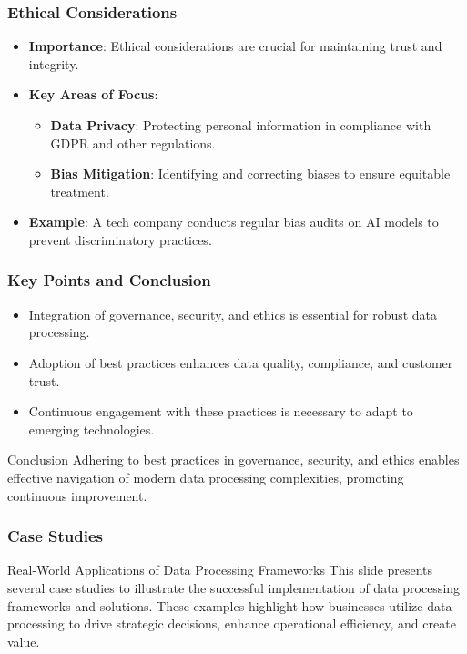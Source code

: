 \documentclass{beamer}
\begin{document}
\begin{frame}[fragile]
    \frametitle{Ethical Considerations}
    \begin{itemize}
        \item \textbf{Importance}: Ethical considerations are crucial for maintaining trust and integrity.
        \item \textbf{Key Areas of Focus}:
        \begin{itemize}
            \item \textbf{Data Privacy}: Protecting personal information in compliance with GDPR and other regulations.
            \item \textbf{Bias Mitigation}: Identifying and correcting biases to ensure equitable treatment.
        \end{itemize}
        \item \textbf{Example}: A tech company conducts regular bias audits on AI models to prevent discriminatory practices.
    \end{itemize}
\end{frame}

\begin{frame}[fragile]
    \frametitle{Key Points and Conclusion}
    \begin{itemize}
        \item Integration of governance, security, and ethics is essential for robust data processing.
        \item Adoption of best practices enhances data quality, compliance, and customer trust.
        \item Continuous engagement with these practices is necessary to adapt to emerging technologies.
    \end{itemize}
    \begin{block}{Conclusion}
        Adhering to best practices in governance, security, and ethics enables effective navigation of modern data processing complexities, promoting continuous improvement.
    \end{block}
\end{frame}

\begin{frame}[fragile]
    \frametitle{Case Studies}
    \begin{block}{Real-World Applications of Data Processing Frameworks}
        This slide presents several case studies to illustrate the successful implementation of data processing frameworks and solutions. 
        These examples highlight how businesses utilize data processing to drive strategic decisions, enhance operational efficiency, and create value.
    \end{block}
\end{frame}
\end{document}
